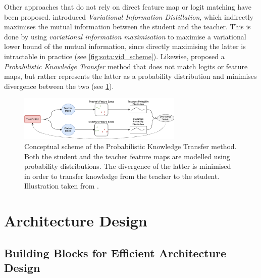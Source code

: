 Other approaches that do not rely on direct feature map or logit matching have
been proposed. \cite{DBLP:conf/cvpr/AhnHDLD19} introduced \emph{Variational
Information Distillation}, which indirectly maximises the mutual information
between the student and the teacher. This is done by using \emph{variational
information maximisation} \cite{barber2004algorithm} to maximise a variational
lower bound of the mutual information, since directly maximising the latter is
intractable in practice (see \cref{fig:sota:vid_scheme}). Likewise,
\cite{DBLP:conf/eccv/PassalisT18} proposed a \emph{Probabilistic Knowledge Transfer}
method that does not match logits or feature maps, but rather represents the
latter as a probability distribution and minimises divergence between the two
(see \cref{fig:sota:pkt_scheme}).\\


\begin{figure}[htbp]
    \centering
    \includegraphics[width=0.7\textwidth]{chapter_sota/assets/pkt_diagram.pdf}
    \caption{Conceptual scheme of the
    Probabilistic Knowledge Transfer method. Both the student and the teacher
    feature maps are modelled using probability distributions. The divergence of the
    latter is minimised in order to transfer knowledge from the teacher to the
    student. Illustration taken from \cite{DBLP:conf/eccv/PassalisT18}.}
    \label{fig:sota:pkt_scheme}
\end{figure}

\section{Architecture Design}\label{sec:sota:archi_design}

\subsection{Building Blocks for Efficient Architecture Design}\label{sec:sota:efficient_archi}


